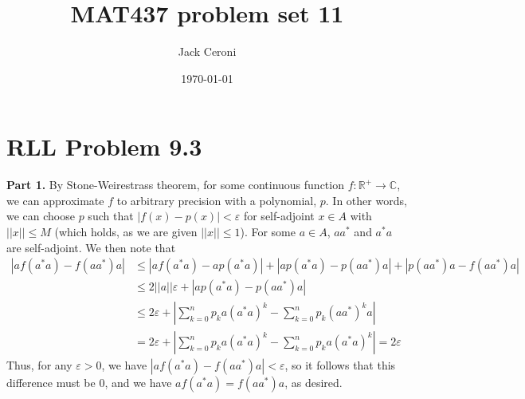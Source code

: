 \documentclass[aps,pra,showpacs,notitlepage,onecolumn,superscriptaddress,nofootinbib]{revtex4-1}
\theoremstyle{definition}
\begin{document}
\title{MAT437 problem set 11}
\author{Jack Ceroni}

\date{\today}

\maketitle

\section{RLL Problem 9.3}

\noindent \textbf{Part 1.} By Stone-Weirestrass theorem, for some continuous function $f : \mathbb{R}^{+} \rightarrow \mathbb{C}$, we can approximate $f$ to arbitrary precision
with a polynomial, $p$. In other words, we can choose $p$ such that $|f(x) - p(x)| < \varepsilon$ for self-adjoint $x \in A$ with $||x|| \leq M$ (which holds, as we are given $||x|| \leq 1$).
For some $a \in A$, $a a^{*}$ and $a^{*} a$ are self-adjoint. We then note that
\begin{align}
  \left| a f(a^{*} a) - f(a a^{*}) a \right| & \leq \left| a f(a^{*} a) - a p(a^{*} a) \right| + \left| a p(a^{*} a) - p(a a^{*}) a \right| + \left| p(a a^{*}) a - f(a a^{*}) a \right|
  \\ & \leq 2 ||a|| \varepsilon + \left| a p(a^{*} a) - p(a a^{*}) a \right|
  \\ & \leq 2 \varepsilon + \left| \displaystyle\sum_{k = 0}^{n} p_k a (a^{*} a)^k - \displaystyle\sum_{k = 0}^{n} p_k (a a^{*})^k a \right|
  \\ & = 2 \varepsilon + \left| \displaystyle\sum_{k = 0}^{n} p_k a (a^{*} a)^k - \displaystyle\sum_{k = 0}^{n} p_k a (a^{*} a)^k \right| = 2\varepsilon
\end{align}
Thus, for any $\varepsilon > 0$, we have $ \left| a f(a^{*} a) - f(a a^{*}) a \right| < \varepsilon$, so it follows that this difference must be $0$, and we have $a f(a^{*} a) = f(a a^{*}) a$, as desired.
\newline
\end{document}
